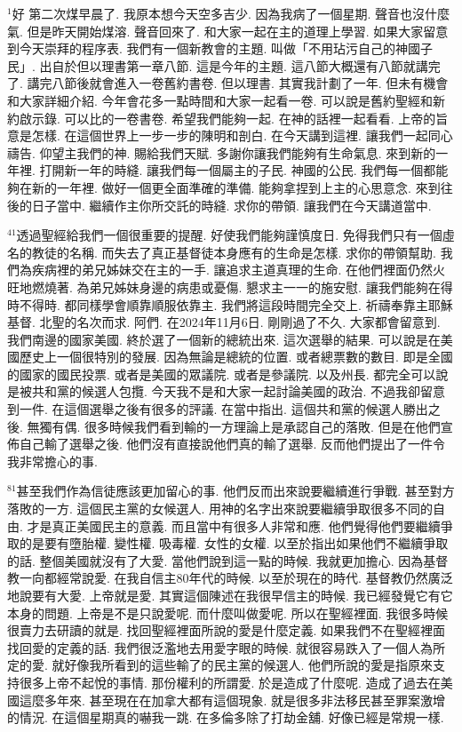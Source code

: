 \documentclass{book}
\begin{document}
$^{1}$好 第二次煤早晨了.
我原本想今天空多吉少.
因為我病了一個星期.
聲音也沒什麼氣.
但是昨天開始煤溶.
聲音回來了.
和大家一起在主的道理上學習.
如果大家留意到今天崇拜的程序表.
我們有一個新教會的主題.
叫做「不用玷污自己的神國子民」.
出自於但以理書第一章八節.
這是今年的主題.
這八節大概還有八節就講完了.
講完八節後就會進入一卷舊約書卷.
但以理書.
其實我計劃了一年.
但未有機會和大家詳細介紹.
今年會花多一點時間和大家一起看一卷.
可以說是舊約聖經和新約啟示錄.
可以比的一卷書卷.
希望我們能夠一起.
在神的話裡一起看看.
上帝的旨意是怎樣.
在這個世界上一步一步的陳明和剖白.
在今天講到這裡.
讓我們一起同心禱告.
仰望主我們的神.
賜給我們天賦.
多謝你讓我們能夠有生命氣息.
來到新的一年裡.
打開新一年的時縫.
讓我們每一個屬主的子民.
神國的公民.
我們每一個都能夠在新的一年裡.
做好一個更全面準確的準備.
能夠拿捏到上主的心思意念.
來到往後的日子當中.
繼續作主你所交託的時縫.
求你的帶領.
讓我們在今天講道當中.

$^{41}$透過聖經給我們一個很重要的提醒.
好使我們能夠謹慎度日.
免得我們只有一個虛名的教徒的名稱.
而失去了真正基督徒本身應有的生命是怎樣.
求你的帶領幫助.
我們為疾病裡的弟兄姊妹交在主的一手.
讓追求主道真理的生命.
在他們裡面仍然火旺地燃燒著.
為弟兄姊妹身邊的病患或憂傷.
懇求主一一的施安慰.
讓我們能夠在得時不得時.
都同樣學會順靠順服依靠主.
我們將這段時間完全交上.
祈禱奉靠主耶穌基督.
北聖的名次而求.
阿們.
在2024年11月6日.
剛剛過了不久.
大家都會留意到.
我們南邊的國家美國.
終於選了一個新的總統出來.
這次選舉的結果.
可以說是在美國歷史上一個很特別的發展.
因為無論是總統的位置.
或者總票數的數目.
即是全國的國家的國民投票.
或者是美國的眾議院.
或者是參議院.
以及州長.
都完全可以說是被共和黨的候選人包攬.
今天我不是和大家一起討論美國的政治.
不過我卻留意到一件.
在這個選舉之後有很多的評議.
在當中指出.
這個共和黨的候選人勝出之後.
無獨有偶.
很多時候我們看到輸的一方理論上是承認自己的落敗.
但是在他們宣佈自己輸了選舉之後.
他們沒有直接說他們真的輸了選舉.
反而他們提出了一件令我非常擔心的事.

$^{81}$甚至我們作為信徒應該更加留心的事.
他們反而出來說要繼續進行爭戰.
甚至對方落敗的一方.
這個民主黨的女候選人.
用神的名字出來說要繼續爭取很多不同的自由.
才是真正美國民主的意義.
而且當中有很多人非常和應.
他們覺得他們要繼續爭取的是要有墮胎權.
變性權.
吸毒權.
女性的女權.
以至於指出如果他們不繼續爭取的話.
整個美國就沒有了大愛.
當他們說到這一點的時候.
我就更加擔心.
因為基督教一向都經常說愛.
在我自信主80年代的時候.
以至於現在的時代.
基督教仍然廣泛地說要有大愛.
上帝就是愛.
其實這個陳述在我很早信主的時候.
我已經發覺它有它本身的問題.
上帝是不是只說愛呢.
而什麼叫做愛呢.
所以在聖經裡面.
我很多時候很賣力去研讀的就是.
找回聖經裡面所說的愛是什麼定義.
如果我們不在聖經裡面找回愛的定義的話.
我們很泛濫地去用愛字眼的時候.
就很容易跌入了一個人為所定的愛.
就好像我所看到的這些輸了的民主黨的候選人.
他們所說的愛是指原來支持很多上帝不起悅的事情.
那份權利的所謂愛.
於是造成了什麼呢.
造成了過去在美國這麼多年來.
甚至現在在加拿大都有這個現象.
就是很多非法移民甚至罪案激增的情況.
在這個星期真的嚇我一跳.
在多倫多除了打劫金舖.
好像已經是常規一樣.
\end{document}
